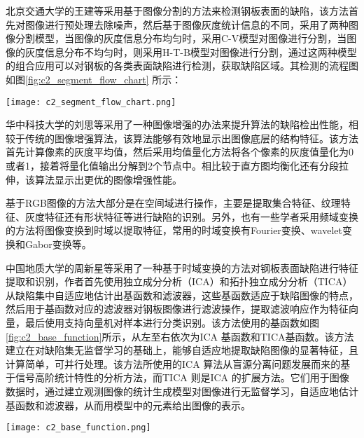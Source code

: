     北京交通大学的王建等\cite{王健2016基于图像分割的钢板表面缺陷识别}采用基于图像分割的方法来检测钢板表面的缺陷，该方法首先对图像进行预处理去除噪声，然后基于图像灰度统计信息的不同，采用了两种图像分割模型，当图像的灰度信息分布均匀时，采用C-V模型对图像进行分割，当图像的灰度信息分布不均匀时，则采用H-T-B模型对图像进行分割，通过这两种模型的组合应用可以对钢板的各类表面缺陷进行检测，获取缺陷区域。其检测的流程图如图\ref{fig:c2_segment_flow_chart} 所示：

    \begin{figure*}[!h]
    \centering
    \texttt{[image: c2\_segment\_flow\_chart.png]}
    \caption{基于图像分割的缺陷检测流程图}
    \label{fig:c2_segment_flow_chart}
    \end{figure*}

    华中科技大学的刘思等\cite{刘思2011复杂背景下钢板表面缺陷检测的图像增强方法}采用了一种图像增强的办法来提升算法的缺陷检出性能，相较于传统的图像增强算法，该算法能够有效地显示出图像底层的结构特征。该方法首先计算像素的灰度平均值，然后采用均值量化方法将各个像素的灰度值量化为0或者1，接着将量化值输出分解到2个节点中。相比较于直方图均衡化还有分段拉伸，该算法显示出更优的图像增强性能。

    基于RGB图像的方法大部分是在空间域进行操作，主要是提取集合特征、纹理特征、灰度特征还有形状特征等进行缺陷的识别。另外，也有一些学者采用频域变换的方法将图像变换到时域以提取特征，常用的时域变换有Fourier变换、wavelet变换和Gabor变换等。

    中国地质大学的周新星等\cite{周新星2012基于独立成分分析的表面缺陷特征提取与识别方法}采用了一种基于时域变换的方法对钢板表面缺陷进行特征提取和识别，作者首先使用独立成分分析（ICA）和拓扑独立成分分析（TICA）从缺陷集中自适应地估计出基函数和滤波器，这些基函数适应于缺陷图像的特点，然后用于基函数对应的滤波器对钢板图像进行滤波操作，提取滤波响应作为特征向量，最后使用支持向量机对样本进行分类识别。该方法使用的基函数如图\ref{fig:c2_base_function}所示，从左至右依次为ICA 基函数和TICA基函数。该方法建立在对缺陷集无监督学习的基础上，能够自适应地提取缺陷图像的显著特征，且计算简单，可并行处理。该方法所使用的ICA 算法从盲源分离问题发展而来的基于信号高阶统计特性的分析方法，而TICA 则是ICA 的扩展方法。它们用于图像数据时，通过建立观测图像的统计生成模型对图像进行无监督学习，自适应地估计基函数和滤波器，从而用模型中的元素给出图像的表示。

    \begin{figure*}[!h]
    \centering
    \texttt{[image: c2\_base\_function.png]}
    \caption{缺陷基函数示意图}
    \label{fig:c2_base_function}
    \end{figure*}

